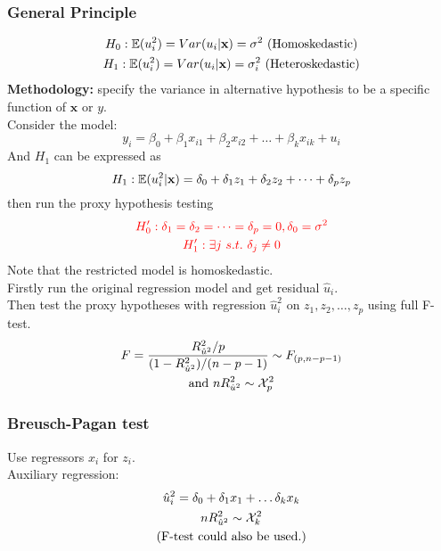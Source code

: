 \documentclass[]{article}
\begin{document}
		\subsubsection{General Principle}
			\begin{gather*}
				H_0: \mathbb{E}({u_i^2}) = Var(u_i|\textbf{x}) = \sigma^2 \text{{ (Homoskedastic)}} \\
				H_1: \mathbb{E}({u_i^2}) = Var(u_i|\textbf{x}) = \sigma_i^2 \text{{ (Heteroskedastic)}}
			\end{gather*}
			\textbf{Methodology:} specify the variance in alternative hypothesis to be a specific function of $\textbf{x}$ or $y$. \\
			Consider the model: 
			\[
				y_i = \beta_0 + \beta_1 x_{i1} + \beta_2 x_{i2} + \dots + \beta_k x_{ik} + u_i
			\]
			And $H_1$ can be expressed as 
			\[
				H_1: \mathbb{E}({u_i^2|\textbf{x}}) = \delta_0 + \delta_1 z_1 + \delta_2 z_2 + \dots + \delta_p z_p
			\]
			then run the proxy hypothesis testing
			\begin{gather*}
				\textcolor{red}{H_0': \delta_1 = \delta_2 = \dots = \delta_p = 0, \delta_0 = \sigma^2} \\
				\textcolor{red}{H_1': \exists j\ s.t.\ \delta_j \neq 0}
			\end{gather*}
			Note that the restricted model is homoskedastic. \\
			Firstly run the original regression model and get residual $\hat{u}_i$. \\
			Then test the proxy hypotheses with regression $\hat{u}_i^2$ on $z_1, z_2, \dots, z_p$ using full F-test.
			\begin{gather*}
				F = \frac{R^2_{\hat{u}^2}/p}{(1-R^2_{\hat{u}^2})/(n-p-1)} \sim F_{(p, n-p-1)} \\
				 \text{{and }}n R^2_{\hat{u}^2} \sim \mathcal{{X}}_p^2
			\end{gather*}
			
			\subsubsection{Breusch-Pagan test}
				\par Use regressors $x_i$ for $z_i$. \\
				Auxiliary regression:
				\begin{gather*}
					\hat{u}_i^2 = \delta_0 + \delta_1 x_1 + \dots \delta_k x_k \\
					n R^2_{\hat{u}^2} \sim \mathcal{{X}}_k^2 \\
					\text{{(F-test could also be used.)}}
				\end{gather*}
\end{document}
